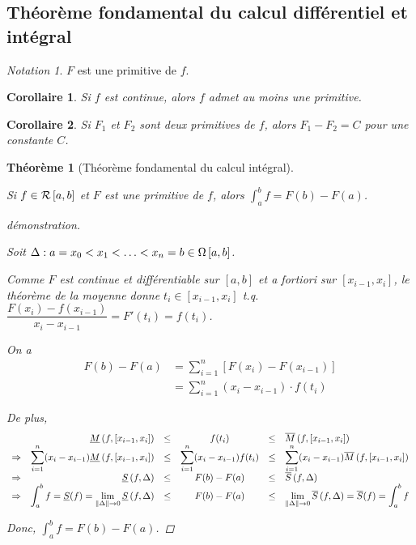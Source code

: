 \documentclass{report}
\newcommand*{\Ssup}[1]{\overline{S}(#1)}
\newcommand*{\Sinf}[1]{\underline{S}(#1)}
\newcommand*{\norme}[1]{\left\| #1 \right\|}
\newtheorem*{thm}{Th\'eor\`eme}
\newtheorem*{coro}{Corollaire}
\theoremstyle{definition}
\theoremstyle{remark}
\newtheorem*{nota}{Notation}
\begin{document}
	\subsection{Th\'eor\`eme fondamental du calcul diff\'erentiel et int\'egral}
	\begin{nota}
		$F$ est une primitive de $f$.
	\end{nota}
	\begin{coro}
		Si $f$ est continue, alors $f$ admet au moins une primitive.
	\end{coro}
	\begin{coro}
		Si $F_1$ et $F_2$ sont deux primitives de $f$, alors $F_1-F_2=C$ pour une constante $C$.
	\end{coro}
	\begin{thm}[Th\'eor\`eme fondamental du calcul int\'egral]~

		Si $f \in \riemann$ et $F$ est une primitive de $f$, alors $\int_{a}^{b}f=F(b)-F(a)$.
		\begin{proof}[d\'emonstration]~

			Soit $\Delta:a=x_0<x_1<\dotsc<x_n=b \in \partitions$.

			Comme $F$ est continue et diff\'erentiable sur $[a,b]$ et a fortiori sur $[x_{i-1},x_i]$, le th\'eor\`eme de la moyenne donne $t_i \in [x_{i-1},x_i]$ t.q. $\dfrac{F(x_i) - f(x_{i-1})}{x_i-x_{i-1}} = F'(t_i) = f(t_i)$.

			On a
			\begin{align*}
				F(b)-F(a)&= \sum_{i=1}^{n}\left[ F(x_i)-F(x_{i-1}) \right]\\
				&= \sum_{i=1}^{n}(x_i-x_{i-1}) \cdot f(t_i)
			\end{align*}

			De plus,
			\[
			\begin{array}{rrcccl}
				&\minf{f}[x_{i-1},x_i] &\leq& f(t_i) &\leq& \msup{f}[x_{i-1},x_i]\\
				\Rightarrow&\displaystyle\sum_{i=1}^{n}(x_i-x_{i-1})\minf{f}[x_{i-1},x_i] &\leq& \displaystyle\sum_{i=1}^{n}(x_i-x_{i-1})f(t_i) &\leq& \displaystyle\sum_{i=1}^{n}(x_i-x_{i-1})\msup{f}[x_{i-1},x_i]\\
				\Rightarrow&\sinf{f} &\leq& F(b)-F(a) &\leq& \ssup{f}\\
				\Rightarrow&\displaystyle\int_{a}^{b}f=\Sinf{f}=\lim\limits_{\norme{\Delta}\to0}\sinf{f} &\leq& F(b)-F(a) &\leq& \lim\limits_{\norme{\Delta}\to0}\ssup{f}=\Ssup{f}=\displaystyle\int_{a}^{b}f
			\end{array}
			\]

			Donc, $\int_{a}^{b}f=F(b)-F(a)$.
		\end{proof}
	\end{thm}
\end{document}
